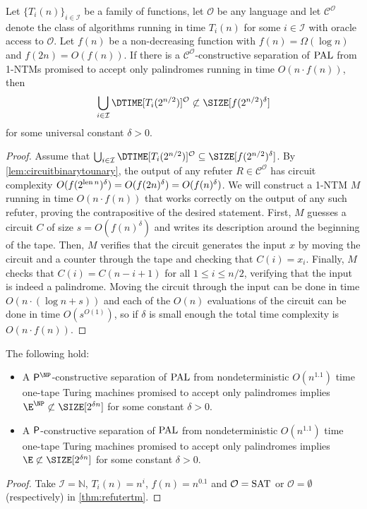 \begin{theorem}
    \label{thm:refutertm}
    Let $\{T_i(n)\}_{i \in \mathcal{I}}$ be a family of functions, let $\mathcal{O}$ be any language
    and let $\mathcal{C}^\mathcal{O}$ denote the class of algorithms
    running in time $T_i(n)$ for some $i \in \mathcal{I}$ with oracle access to $\mathcal{O}$. 
    Let $f(n)$ be a non-decreasing function with $f(n) = \Omega(\log n)$ and $f(2n) = O(f(n))$.
    If there is a $\mathcal{C}^\mathcal{O}$-constructive separation of $\mathrm{PAL}$ from
    1-NTMs promised to accept only palindromes running in time $O(n \cdot f(n))$, then 
    $$\bigcup_{i\in \mathcal{I}} \DTIME[T_i(2^{n/2})]^{\mathcal{O}} \not\subset \SIZE[f(2^{n/2})^\delta]$$
    for some universal constant $\delta > 0$.  
\end{theorem}
\begin{proof}
Assume that $\bigcup_{i\in \mathcal{I}} \DTIME[T_i(2^{n/2})]^{\mathcal{O}} \subseteq \SIZE[f(2^{n/2})^\delta]$. 
By \cref{lem:circuitbinarytounary}, the output of any refuter $R \in \mathcal{C}^\mathcal{O}$ has circuit complexity
$O(f(2^{\operatorname{len} n})^\delta) = O(f(2n)^\delta) = O(f(n)^\delta)$. We will construct a 1-NTM $M$ running in time $O(n \cdot f(n))$
that works correctly on the output of any such refuter, proving the contrapositive of the desired statement. 
First, $M$ guesses a circuit $C$ of size $s = O(f(n)^\delta)$ and writes its description around the beginning of the tape.
Then, $M$ verifies that the circuit generates the input $x$ by moving the circuit and a counter through the tape
and checking that $C(i) = x_i$. Finally, $M$ checks that $C(i) = C(n-i+1)$ for all $1 \leq i \leq n/2$, verifying that
the input is indeed a palindrome. Moving the circuit through the input can be done in time $O(n \cdot (\log n + s))$ and each
of the $O(n)$ evaluations of the circuit can be done in time $O(s^{O(1)})$, so if $\delta$ is small enough the total
time complexity is $O(n \cdot f(n))$. 
\end{proof}

\begin{corollary}
The following hold:
\begin{itemize}
    \item A $\PTIME^{\NP}$-constructive separation of $\mathrm{PAL}$ from nondeterministic $O(n^{1.1})$ time
    one-tape Turing machines promised to accept only palindromes implies $\E^{\NP} \not \subset \SIZE[2^{\delta n}]$ for some constant $\delta >0$.
	    
    \item A $\mathsf{P}$-constructive separation of $\mathrm{PAL}$ from nondeterministic $O(n^{1.1})$ time
    one-tape Turing machines promised to accept only palindromes implies $\E \not \subset \SIZE[2^{\delta n}]$ for some constant $\delta >0$.
\end{itemize}
\end{corollary}
\begin{proof}
Take $\mathcal{I} = \mathbb{N}$, $T_i(n) = n^i$, $f(n) = n^{0.1}$ and $\mathcal{O} = \mathrm{SAT}$ or $\mathcal{O} = \emptyset$ (respectively) in \cref{thm:refutertm}.
\end{proof}

